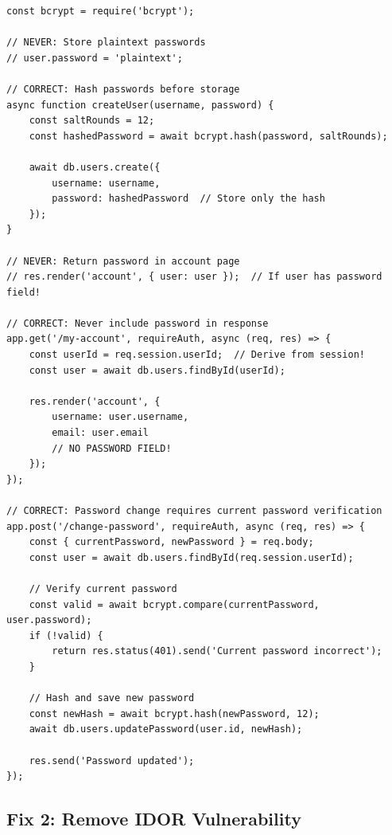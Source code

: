 \documentclass[11pt,letterpaper]{article}
\begin{document}
\par\noindent\begin{minipage}{\linewidth}
\captionsetup{hypcap=false}%
\end{minipage}\par\nopagebreak
\begin{verbatim}
const bcrypt = require('bcrypt');

// NEVER: Store plaintext passwords
// user.password = 'plaintext';

// CORRECT: Hash passwords before storage
async function createUser(username, password) {
    const saltRounds = 12;
    const hashedPassword = await bcrypt.hash(password, saltRounds);

    await db.users.create({
        username: username,
        password: hashedPassword  // Store only the hash
    });
}

// NEVER: Return password in account page
// res.render('account', { user: user });  // If user has password field!

// CORRECT: Never include password in response
app.get('/my-account', requireAuth, async (req, res) => {
    const userId = req.session.userId;  // Derive from session!
    const user = await db.users.findById(userId);

    res.render('account', {
        username: user.username,
        email: user.email
        // NO PASSWORD FIELD!
    });
});

// CORRECT: Password change requires current password verification
app.post('/change-password', requireAuth, async (req, res) => {
    const { currentPassword, newPassword } = req.body;
    const user = await db.users.findById(req.session.userId);

    // Verify current password
    const valid = await bcrypt.compare(currentPassword, user.password);
    if (!valid) {
        return res.status(401).send('Current password incorrect');
    }

    // Hash and save new password
    const newHash = await bcrypt.hash(newPassword, 12);
    await db.users.updatePassword(user.id, newHash);

    res.send('Password updated');
});
\end{verbatim}
\par

\subsection{Fix 2: Remove IDOR Vulnerability}
\end{document}
